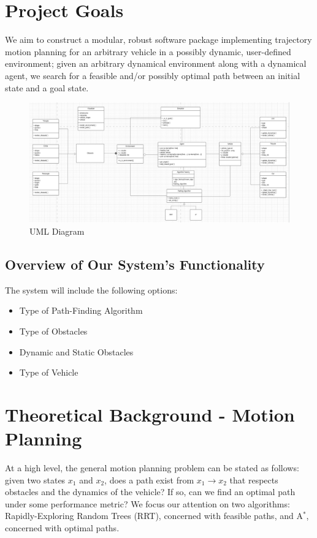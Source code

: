 \documentclass[10pt,letterpaper]{article}
\begin{document}
\section{Project Goals}
We aim to construct a modular, robust software package implementing trajectory motion planning for an arbitrary vehicle in a possibly dynamic, user-defined environment; given an arbitrary dynamical environment along with a dynamical agent, we search for a feasible and/or possibly optimal path between an initial state and a goal state. 



\begin{figure}
    \centering
    \includegraphics[width= 27 cm]{figures/UML.png}
    \caption{UML Diagram}
    \label{fig: UML}
\end{figure}


\subsection*{Overview of Our System's Functionality}
The system will include the following options:
\begin{itemize}
    \item Type of Path-Finding Algorithm
    \item Type of Obstacles
    \item Dynamic and Static Obstacles 
    \item Type of Vehicle
\end{itemize}

\section{Theoretical Background - Motion Planning}

At a high level, the general motion planning problem can be stated as follows: given two states $x_1$ and $x_2$, does a path exist from $ x_1 \rightarrow x_2$ that respects obstacles and the dynamics of the vehicle? If so, can we find an optimal path under some performance metric? We focus our attention on two algorithms: Rapidly-Exploring Random Trees (RRT), concerned with feasible paths, and A$^*$, concerned with optimal paths.
\end{document}

